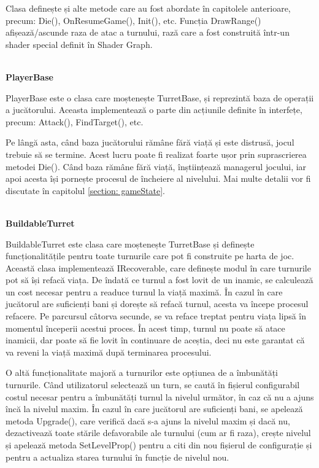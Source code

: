 \documentclass[12pt, a4paper]{article}
\begin{document}
	Clasa definește și alte metode care au fost abordate în capitolele anterioare, precum: Die(), OnResumeGame(), Init(), etc. Funcția DrawRange() afișează/ascunde raza de atac a turnului, rază care a fost construită într-un shader special definit în Shader Graph.
	
	\ \\
	\textbf{PlayerBase}
	
	PlayerBase este o clasa care moștenește TurretBase, și reprezintă baza de operații a jucătorului. Aceasta implementează o parte din acțiunile definite în interfețe, precum: Attack(), FindTarget(), etc.
	\newline
	
	Pe lângă asta, când baza jucătorului rămâne fără viață și este distrusă, jocul trebuie să se termine. Acest lucru poate fi realizat foarte ușor prin suprascrierea metodei Die(). Când baza rămâne fără viață, înștiințează managerul jocului, iar apoi acesta își pornește procesul de încheiere al nivelului. Mai multe detalii vor fi discutate în capitolul \ref{section: gameState}.
	
	\ \\
	\textbf{BuildableTurret}
	
	BuildableTurret este clasa care moștenește TurretBase și definește \newline funcționalitățile pentru toate turnurile care pot fi construite pe harta de joc. Această clasa implementează IRecoverable, care definește modul în care turnurile pot să își refacă viața. De îndată ce turnul a fost lovit de un inamic, se calculează un cost necesar pentru a readuce turnul la viață maximă. În cazul în care jucătorul are suficienți bani și dorește să refacă turnul, acesta va începe procesul refacere. Pe parcursul câtorva secunde, se va reface treptat pentru viața lipsă în momentul începerii acestui proces. În acest timp, turnul nu poate să atace inamicii, dar poate să fie lovit în continuare de aceștia, deci nu este garantat că va reveni la viață maximă după terminarea procesului.
	\newline
	
	O altă funcționalitate majoră a turnurilor este opțiunea de a îmbunătăți turnurile. Când utilizatorul selectează un turn, se caută în fișierul configurabil costul necesar pentru a îmbunătăți turnul la nivelul următor, în caz că nu a ajuns încă la nivelul maxim. În cazul în care jucătorul are suficienți bani, se apelează metoda Upgrade(), care verifică dacă s-a ajuns la nivelul maxim și dacă nu, dezactivează toate stările defavorabile ale turnului (cum ar fi raza), crește nivelul și apelează metoda SetLevelProp() pentru a citi din nou fișierul de configurație și pentru a actualiza starea turnului în funcție de nivelul nou.
	\newline
	
\end{document}
